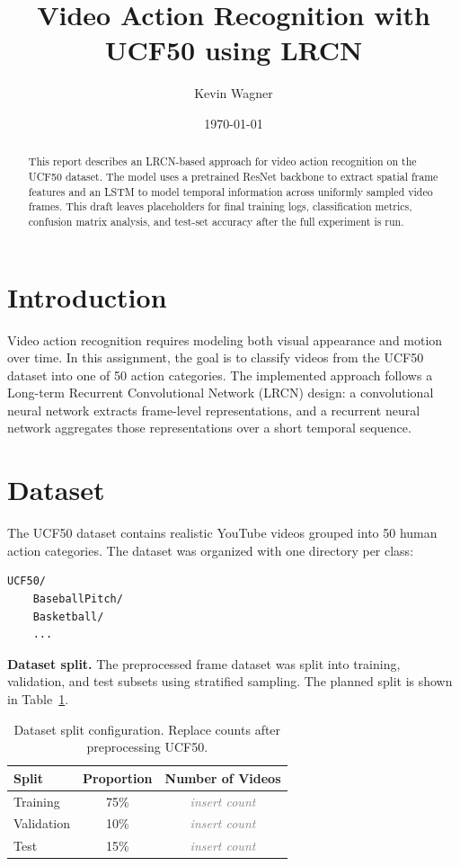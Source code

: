 \documentclass[11pt]{article}
\title{Video Action Recognition with UCF50 using LRCN}
\author{Kevin Wagner}
\date{\today}
\newcommand{\placeholder}[1]{\textcolor{gray}{\textit{#1}}}
\begin{document}
\maketitle

\begin{abstract}
This report describes an LRCN-based approach for video action recognition on the UCF50 dataset.
The model uses a pretrained ResNet backbone to extract spatial frame features and an LSTM to model temporal information across uniformly sampled video frames.
This draft leaves placeholders for final training logs, classification metrics, confusion matrix analysis, and test-set accuracy after the full experiment is run.
\end{abstract}

\section{Introduction}

Video action recognition requires modeling both visual appearance and motion over time.
In this assignment, the goal is to classify videos from the UCF50 dataset into one of 50 action categories.
The implemented approach follows a Long-term Recurrent Convolutional Network (LRCN) design: a convolutional neural network extracts frame-level representations, and a recurrent neural network aggregates those representations over a short temporal sequence.

\section{Dataset}

The UCF50 dataset contains realistic YouTube videos grouped into 50 human action categories.
The dataset was organized with one directory per class:

\begin{verbatim}
UCF50/
    BaseballPitch/
    Basketball/
    ...
\end{verbatim}

\noindent
\textbf{Dataset split.}
The preprocessed frame dataset was split into training, validation, and test subsets using stratified sampling.
The planned split is shown in Table~\ref{tab:data-split}.

\begin{table}[h]
    \centering
    \caption{Dataset split configuration. Replace counts after preprocessing UCF50.}
    \label{tab:data-split}
    \begin{tabular}{lcc}
        \toprule
        Split & Proportion & Number of Videos \\
        \midrule
        Training & 75\% & \placeholder{insert count} \\
        Validation & 10\% & \placeholder{insert count} \\
        Test & 15\% & \placeholder{insert count} \\
        \bottomrule
    \end{tabular}
\end{table}
\end{document}
